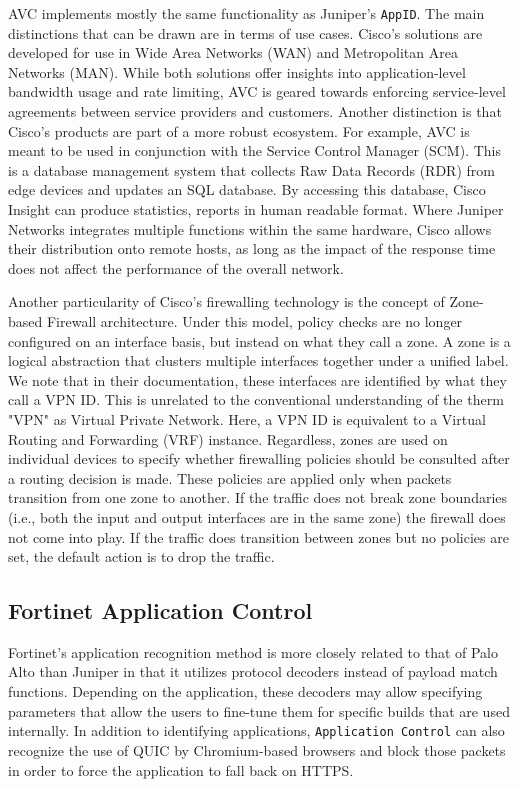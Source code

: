 AVC implements mostly the same functionality as Juniper's \texttt{AppID}. The main
distinctions that can be drawn are in terms of use cases. Cisco's solutions are
developed for use in Wide Area Networks (WAN) and Metropolitan Area Networks (MAN).
While both solutions offer insights into application-level bandwidth usage and
rate limiting, AVC is geared towards enforcing service-level agreements between
service providers and customers. Another distinction is that Cisco's products
are part of a more robust ecosystem. For example, AVC is meant to be used in
conjunction with the Service Control Manager (SCM). This is a database management
system that collects Raw Data Records (RDR) from edge devices and updates an SQL
database. By accessing this database, Cisco Insight can produce statistics,
reports in human readable format. Where Juniper Networks integrates multiple
functions within the same hardware, Cisco allows their distribution onto remote
hosts, as long as the impact of the response time does not affect the performance
of the overall network.

Another particularity of Cisco's firewalling technology is the concept of Zone-based
Firewall architecture. Under this model, policy checks are no longer configured
on an interface basis, but instead on what they call a zone. A zone is a logical
abstraction that clusters multiple interfaces together under a unified label.
We note that in their documentation, these interfaces are identified by what they
call a VPN ID. This is unrelated to the conventional understanding of the
therm "VPN" as Virtual Private Network. Here, a VPN ID is equivalent to a
Virtual Routing and Forwarding (VRF) instance. Regardless, zones are used on
individual devices to specify whether firewalling policies should be consulted
after a routing decision is made. These policies are applied only when packets
transition from one zone to another. If the traffic does not break zone
boundaries (i.e., both the input and output interfaces are in the same zone)
the firewall does not come into play. If the traffic does transition between
zones but no policies are set, the default action is to drop the traffic.

\subsection{Fortinet Application Control}

Fortinet's application recognition method is more closely related to that of
Palo Alto than Juniper in that it utilizes protocol decoders instead of payload
match functions. Depending on the application, these decoders may allow
specifying parameters that allow the users to fine-tune them for specific
builds that are used internally. In addition to identifying applications,
\texttt{Application Control} can also recognize the use of QUIC by Chromium-based
browsers and block those packets in order to force the application to fall back
on HTTPS.

